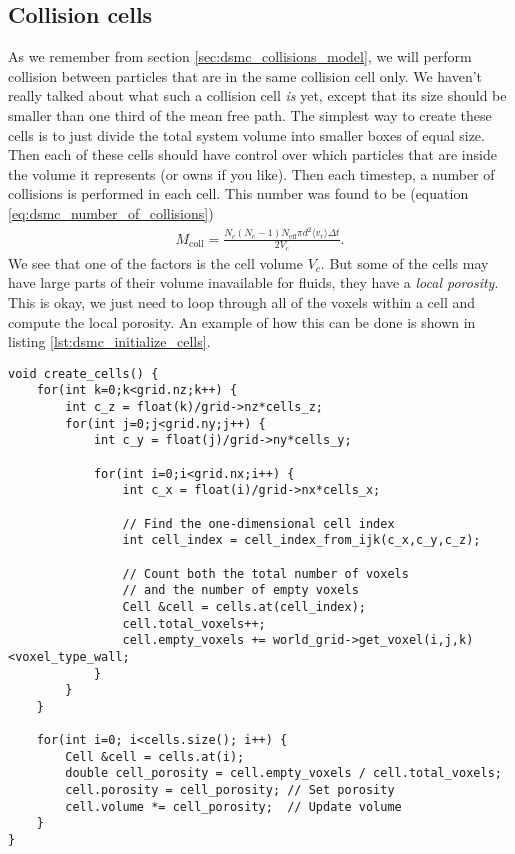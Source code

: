 \subsection{Collision cells}
As we remember from section \ref{sec:dsmc_collisions_model}, we will perform collision between particles that are in the same collision cell only. We haven't really talked about what such a collision cell \textit{is} yet, except that its size should be smaller than one third of the mean free path. The simplest way to create these cells is to just divide the total system volume into smaller boxes of equal size. Then each of these cells should have control over which particles that are inside the volume it represents (or owns if you like). Then each timestep, a number of collisions is performed in each cell. This number was found to be (equation \eqref{eq:dsmc_number_of_collisions})
\begin{align}
	\nonumber
	M_\text{coll} = \frac{N_c(N_c-1)N_\text{eff}\pi d^2\langle v_r \rangle \Delta t}{2 V_c}.
\end{align}
We see that one of the factors is the cell volume $V_c$. But some of the cells may have large parts of their volume inavailable for fluids, they have a \textit{local porosity}. This is okay, we just need to loop through all of the voxels within a cell and compute the local porosity. An example of how this can be done is shown in listing \ref{lst:dsmc_initialize_cells}.
\begin{lstlisting}[caption=Example code showing how to find porosity and volume of the collision cells., label=lst:dsmc_initialize_cells]
void create_cells() {
    for(int k=0;k<grid.nz;k++) {
        int c_z = float(k)/grid->nz*cells_z;
        for(int j=0;j<grid.ny;j++) {
            int c_y = float(j)/grid->ny*cells_y;

            for(int i=0;i<grid.nx;i++) {
                int c_x = float(i)/grid->nx*cells_x;

                // Find the one-dimensional cell index 
                int cell_index = cell_index_from_ijk(c_x,c_y,c_z);

                // Count both the total number of voxels
                // and the number of empty voxels
                Cell &cell = cells.at(cell_index);
                cell.total_voxels++;
                cell.empty_voxels += world_grid->get_voxel(i,j,k)<voxel_type_wall;
            }
        }
    }

    for(int i=0; i<cells.size(); i++) {
    	Cell &cell = cells.at(i);
    	double cell_porosity = cell.empty_voxels / cell.total_voxels;
    	cell.porosity = cell_porosity; // Set porosity
    	cell.volume *= cell_porosity;  // Update volume
    }
}
\end{lstlisting}

